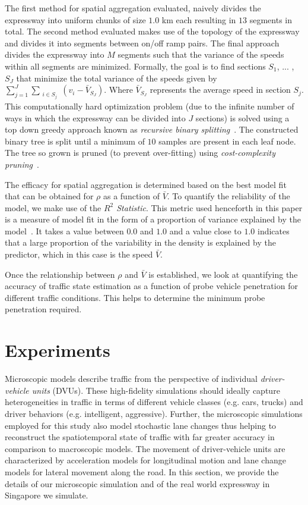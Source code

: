 \documentclass[procedia]{easychair}
\begin{document}
 The first method for spatial aggregation evaluated, naively divides the expressway into uniform chunks of size $1.0$ km each resulting in $13$ segments in total. The second method evaluated makes use of the topology of the expressway and divides it into segments between on/off ramp pairs. The final approach divides the expressway into $M$ segments such that the variance of the speeds within all segments are minimized. Formally, the goal is to find sections $S_{1}$, ... , $S_{J}$ that minimize the total variance of the speeds given by
 $\sum\limits_{j=1}^{J} \sum\limits_{\substack{i \in S_{j}}} (v_{i}-\bar{V}_{S_{J}})$. Where $\bar{V}_{S_{J}}$ represents the average speed in section $S_{j}$. This computationally hard optimization problem (due to the infinite number of ways in which the expressway can be divided into $J$ sections) is solved using a top down greedy approach known as {\it recursive binary splitting}~\cite{james2013introduction}. The constructed binary tree is split until a minimum of $10$ samples are present in each leaf node. The tree so grown is pruned (to prevent over-fitting) using {\it cost-complexity pruning}~\cite{james2013introduction}.
 
 The efficacy for spatial aggregation is determined based on the best model fit that can be obtained for $\rho$ as a function of $\bar{V}$. To quantify the reliability of the model, we make use of the {\it $R^2$ Statistic}. This metric used henceforth in this paper is a measure of model fit in the form of a proportion of variance explained by the model~\cite{james2013introduction}. It takes a value between $0.0$ and $1.0$ and a value close to $1.0$ indicates that a large proportion of the variability in the density is explained by the predictor, which in this case is the speed $\bar{V}$.
 
 Once the relationship between $\rho$ and $\bar{V}$ is established, we look at quantifying the accuracy of traffic state estimation as a function of probe vehicle penetration for different traffic conditions. This helps to determine the minimum probe penetration required.
 
\section{Experiments}
\label{sec:design_expt}

Microscopic models describe traffic from the perspective of individual {\it driver-vehicle units} (DVUs). These high-fidelity simulations should ideally capture heterogeneities in traffic in terms of different vehicle classes (e.g. cars, trucks) and driver behaviors (e.g. intelligent, aggressive). Further, the microscopic simulations employed for this study also model stochastic lane changes thus helping to reconstruct the spatiotemporal state of traffic with far greater accuracy in comparison to macroscopic models. The movement of driver-vehicle units are characterized by acceleration models for longitudinal motion and lane change models for lateral movement along the road. In this section, we provide the details of our microscopic simulation and of the real world expressway in Singapore we simulate.
\end{document}
